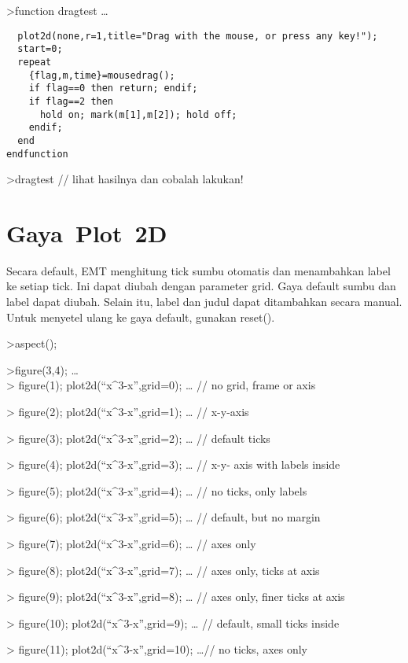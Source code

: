 \documentclass[
]{book}
\begin{document}
\textgreater function dragtest \ldots{}

\begin{verbatim}
  plot2d(none,r=1,title="Drag with the mouse, or press any key!");
  start=0;
  repeat
    {flag,m,time}=mousedrag();
    if flag==0 then return; endif;
    if flag==2 then
      hold on; mark(m[1],m[2]); hold off;
    endif;
  end
endfunction
\end{verbatim}

\textgreater dragtest // lihat hasilnya dan cobalah lakukan!

\section{Gaya~Plot~2D}\label{gaya-plot-2d}

Secara default, EMT menghitung tick sumbu otomatis dan menambahkan label ke setiap tick. Ini dapat diubah dengan parameter grid. Gaya default sumbu dan label dapat diubah. Selain itu, label dan judul dapat ditambahkan secara manual. Untuk menyetel ulang ke gaya default, gunakan reset().

\textgreater aspect();

\textgreater figure(3,4); \ldots{}\\
\textgreater{} figure(1); plot2d(``x\^{}3-x'',grid=0); \ldots{} // no grid, frame or axis

\textgreater{} figure(2); plot2d(``x\^{}3-x'',grid=1); \ldots{} // x-y-axis

\textgreater{} figure(3); plot2d(``x\^{}3-x'',grid=2); \ldots{} // default ticks

\textgreater{} figure(4); plot2d(``x\^{}3-x'',grid=3); \ldots{} // x-y- axis with labels inside

\textgreater{} figure(5); plot2d(``x\^{}3-x'',grid=4); \ldots{} // no ticks, only labels

\textgreater{} figure(6); plot2d(``x\^{}3-x'',grid=5); \ldots{} // default, but no margin

\textgreater{} figure(7); plot2d(``x\^{}3-x'',grid=6); \ldots{} // axes only

\textgreater{} figure(8); plot2d(``x\^{}3-x'',grid=7); \ldots{} // axes only, ticks at axis

\textgreater{} figure(9); plot2d(``x\^{}3-x'',grid=8); \ldots{} // axes only, finer ticks at axis

\textgreater{} figure(10); plot2d(``x\^{}3-x'',grid=9); \ldots{} // default, small ticks inside

\textgreater{} figure(11); plot2d(``x\^{}3-x'',grid=10); \ldots// no ticks, axes only
\end{document}
